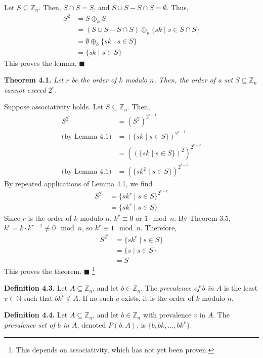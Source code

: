 \documentclass{article}
\newcommand{\zee}{\mathbb{Z}}
\newcommand{\N}{\mathbb{N}}
\begin{document}
Let $S \subseteq \zee_n$.
Then, $S \cap S = S$, and $S \cup S - S \cap S = \emptyset$.
Thus,
\[\begin{split}
S^2 &= S \oplus_k S \\
&= (S \cup S - S \cap S) \oplus_k \{sk \mid s \in S \cap S\} \\
&= \emptyset \oplus_k \{sk \mid s \in S\} \\
&= \{sk \mid s \in S\}
\end{split}\]
This proves the lemma. $\blacksquare$

\textbf{Theorem 4.1.} \textit{Let $r$ be the order of $k$ modulo $n$.
Then, the order of a set $S \subseteq \zee_n$ cannot exceed $2^r$.}

Suppose associativity holds. Let $S \subseteq \zee_n$.
Then,
\[\begin{split}
    S^{2^r} &= (S^2)^{2^{r-1}} \\
    \text{(by Lemma 4.1)} &= (\{sk \mid s \in S\})^{2^{r-1}} \\
    &= ((\{sk \mid s \in S\})^2)^{2^{r-2}} \\
    \text{(by Lemma 4.1)} &= (\{sk^2 \mid s \in S\})^{2^{r-2}}
\end{split}\]
By repeated applications of Lemma 4.1, we find
\[\begin{split}
    S^{2^r} &= \{sk^r \mid s \in S\}^{2^{r-r}} \\
    &= \{sk^r \mid s \in S\}
\end{split}\]
Since $r$ is the order of $k$ modulo $n$, $k^r \equiv 0$ or $1 \mod n$.
By Theorem 3.5, $k^r = k \cdot k^{r-1} \not\equiv 0 \mod n$, so
$k^r \equiv 1 \mod n$. Therefore,
\[\begin{split}
    S^{2^r} &= \{sk^r \mid s \in S\} \\
    &= \{s \mid s \in S\} \\
    &= S
\end{split}\]
This proves the theorem. $\blacksquare$
\footnote{This depends on associativity, which has not yet been proven.}

\textbf{Definition 4.3.} Let $A \subseteq \zee_n$, and let $b \in \zee_n$.
The \textit{prevalence of $b$ in $A$} is the least $v \in \N$ such
that $bk^v \not\in A$. If no such $v$ exists, it is the order
of $k$ modulo $n$.

\textbf{Definition 4.4.} Let $A \subseteq \zee_n$, and let $b \in \zee_n$
with prevalence $v$ in $A$.
The \textit{prevalence set of $b$ in $A$},
denoted $P(b, A)$, is $\{b, bk, \ldots, bk^v\}$.
\end{document}
